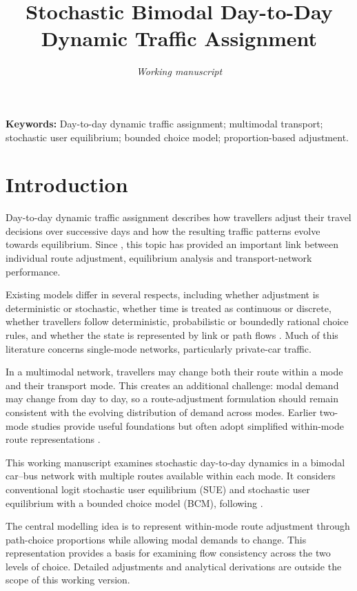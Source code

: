 \documentclass[11pt,a4paper]{article}
\title{Stochastic Bimodal Day-to-Day Dynamic Traffic Assignment}
\author{}
\date{\textit{Working manuscript}}
\begin{document}
\maketitle
\vspace{-1.8em}

\noindent\textbf{Keywords:} Day-to-day dynamic traffic assignment; multimodal transport; stochastic user equilibrium; bounded choice model; proportion-based adjustment.
\vspace{1em}


\section{Introduction}\label{sec:introduction}

Day-to-day dynamic traffic assignment describes how travellers adjust their travel decisions over successive days and how the resulting traffic patterns evolve towards equilibrium. Since \citet{smith1984}, this topic has provided an important link between individual route adjustment, equilibrium analysis and transport-network performance.

Existing models differ in several respects, including whether adjustment is deterministic or stochastic, whether time is treated as continuous or discrete, whether travellers follow deterministic, probabilistic or boundedly rational choice rules, and whether the state is represented by link or path flows \citep{cantarella2016det,cantarella2016stoch,zhou2020}. Much of this literature concerns single-mode networks, particularly private-car traffic.

In a multimodal network, travellers may change both their route within a mode and their transport mode. This creates an additional challenge: modal demand may change from day to day, so a route-adjustment formulation should remain consistent with the evolving distribution of demand across modes. Earlier two-mode studies provide useful foundations but often adopt simplified within-mode route representations \citep{cantarella2015,guo2018}.

This working manuscript examines stochastic day-to-day dynamics in a bimodal car--bus network with multiple routes available within each mode. It considers conventional logit stochastic user equilibrium (SUE) and stochastic user equilibrium with a bounded choice model (BCM), following \citet{watling2018}.

The central modelling idea is to represent within-mode route adjustment through path-choice proportions while allowing modal demands to change. This representation provides a basis for examining flow consistency across the two levels of choice. Detailed adjustments and analytical derivations are outside the scope of this working version.
\end{document}
